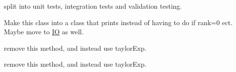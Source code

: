 \begin{DoxyRefList}
split into unit tests, integration tests and validation testing. 
\item[Class \mbox{\hyperlink{class_sys_print}{Sys\+Print}} ]\label{todo__todo000001}%
%
Make this class into a class that prints instead of having to do if rank=0 ect. Maybe move to \mbox{\hyperlink{namespace_i_o}{IO}} as well. 
\item[Class \mbox{\hyperlink{class_taylor2_exp}{Taylor2\+Exp}} ]\label{todo__todo000002}%
%
remove this method, and instead use taylor\+Exp. 
\item[Class \mbox{\hyperlink{class_taylor4_exp}{Taylor4\+Exp}} ]\label{todo__todo000003}%
%
remove this method, and instead use taylor\+Exp.
\end{DoxyRefList}